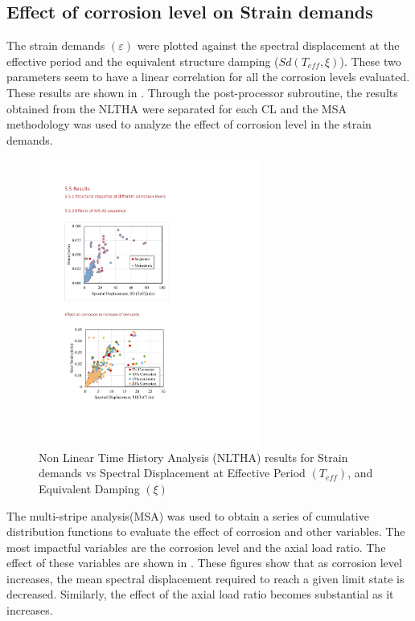 \subsection{Effect of corrosion level on Strain demands}

The strain demands $(\varepsilon)$ were plotted against the spectral displacement at the effective period and the equivalent structure damping ($Sd(T_{eff},\xi)$). These two parameters seem to have a linear correlation for all the corrosion levels evaluated. These results are shown in . Through the post-processor subroutine, the results obtained from the NLTHA were separated for each CL and the MSA methodology was used to analyze the effect of corrosion level in the strain demands.

\begin{figure}[htbp]
	\centering
	\includegraphics[width=0.65\textwidth]{VAC Thesis 2.0/Chapter-5/figs/All_results_NLTHA_Figure.pdf}
	\caption{Non Linear Time History Analysis (NLTHA) results for Strain demands vs Spectral Displacement at Effective Period $(T_{eff})$, and Equivalent Damping $(\xi)$}
	\label{fig:all_results_nltha}
\end{figure}

The multi-stripe analysis(MSA) was used to obtain a series of cumulative distribution functions to evaluate the effect of corrosion and other variables. The most impactful variables are the corrosion level and the axial load ratio. The effect of these variables are shown in . These figures show that as corrosion level increases, the mean spectral displacement required to reach a given limit state is decreased. Similarly, the effect of the axial load ratio becomes substantial as it increases.

